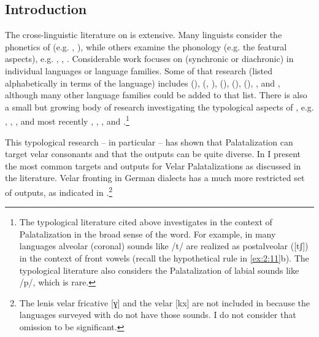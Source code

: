 \begin{xlist}
\begin{xlist}
\subsection{Introduction}\label{sec:2.3.1}

The cross-linguistic literature on  is extensive. Many linguists consider the phonetics of  (e.g. \citealt{Guion1998}, \citealt{Recasens2020}), while others examine the phonology (e.g. the featural aspects), e.g. \citet{LahiriEvers1991}, \citet{Hume1994}, \citet{ClementsHume1995}. Considerable work focuses on  (synchronic or diachronic) in individual languages or language families. Some of that research (listed alphabetically in terms of the language) includes  (\citealt{Kolgjini2004}),  (\citealt{Newton1972a}, \citealt{ManolessouPantelidis2013}),  (\citealt{Schuessler1996}),  (\citealt{Ćavar2004,Gussmann2004}),  (\citealt{Repetti2016, Schmid2016}),  \citep{Jurgec2016}, and  \citep{Urek2016}, although many other language families could be added to that list. There is also a small but growing body of research investigating the typological aspects of , e.g. \citet{Neeld1973}, \citet{Chen1973}, \citet{Bhat1978}, and most recently \citet{Bateman2007, Bateman2011}, \citet{Kochetov2011}, \citet{KrämerUrek2016}, and \citet{Recasens2020}.\footnote{The typological literature cited above investigates  in the context of Palatalization in the broad sense of the word. For example, in many languages alveolar (coronal) sounds like /t/ are realized as postalveolar ([tʃ]) in the context of front vowels (recall the hypothetical rule in \ref{ex:2:11}b). The typological literature also considers the Palatalization of labial sounds like /p/, which is rare.}

This typological research -- in particular \textcite{Bateman2007,Bateman2011} -- has shown that Palatalization can target velar consonants and that the outputs can be quite diverse. In  I present the most common targets and outputs for Velar Palatalizations as discussed in the literature. Velar fronting in German dialects has a much more restricted set of outputs, as indicated in .\footnote{The lenis velar fricative [ɣ] and the velar  [kx] are not included in  because the languages surveyed with  do not have those sounds. I do not consider that omission to be significant.}



\end{xlist}
\end{xlist}
